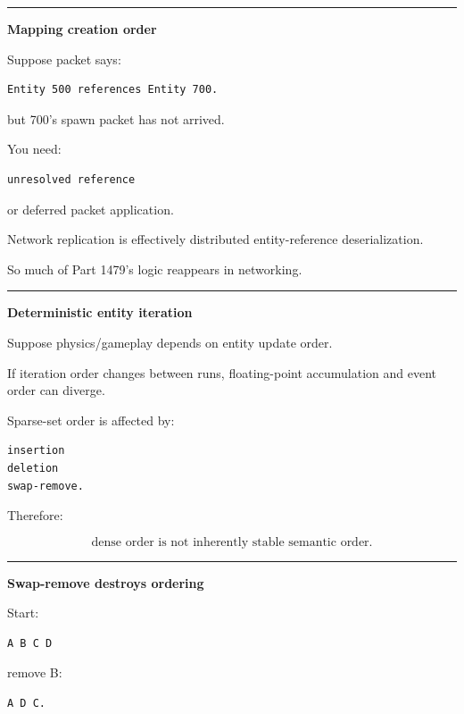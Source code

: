 \begin{center}\rule{0.5\linewidth}{0.5pt}\end{center}

\textbf{Mapping creation order}

Suppose packet says:

\begin{verbatim}
Entity 500 references Entity 700.
\end{verbatim}

but 700's spawn packet has not arrived.

You need:

\begin{verbatim}
unresolved reference
\end{verbatim}

or deferred packet application.

Network replication is effectively distributed entity-reference deserialization.

So much of Part 1479's logic reappears in networking.

\begin{center}\rule{0.5\linewidth}{0.5pt}\end{center}

\textbf{Deterministic entity iteration}

Suppose physics/gameplay depends on entity update order.

If iteration order changes between runs, floating-point accumulation and event order can diverge.

Sparse-set order is affected by:

\begin{verbatim}
insertion
deletion
swap-remove.
\end{verbatim}

Therefore:

\[
\boxed{
\text{dense order is not inherently stable semantic order}.
}
\]

\begin{center}\rule{0.5\linewidth}{0.5pt}\end{center}

\textbf{Swap-remove destroys ordering}

Start:

\begin{verbatim}
A B C D
\end{verbatim}

remove B:

\begin{verbatim}
A D C.
\end{verbatim}

